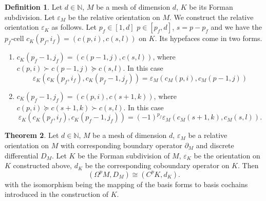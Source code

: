 \documentclass[fleqn]{article}
\theoremstyle{definition}
\newtheorem{theorem}{Theorem}[section]
\newtheorem{definition}[theorem]{Definition}
\begin{document}
\begin{definition}
  Let $d \in \mathbb{N}$, $M$ be a mesh of dimension $d$, $K$ be its Forman
  subdivision.
  Let $\varepsilon_M$ be the relative orientation on $M$.
  We construct the relative orientation $\varepsilon_K$ as follows.
  Let $p_f \in [1, d]$ $p \in [p_f, d]$, $s = p - p_f$ and we have the
  $p_f$-cell $c_K(p_f, i_f) = (c(p, i), c(s, l))$ on $K$.
  Its hypefaces come in two forms.
  \begin{enumerate}
    \item
      $c_K(p_f - 1, j_f) = (c(p - 1, j), c(s, l))$, where
      $c(p, i) \succ c(p - 1, j) \succeq c(s, l)$.
      In this case
      \begin{equation}
        \varepsilon_K(c_K(p_f, i_f), c_K(p_f - 1, j_f))
        = \varepsilon_M(c_M(p, i), c_M(p - 1, j))
      \end{equation}
    \item
      $c_K(p_f - 1, j_f) = (c(p, i), c(s + 1, k))$, where
      $c(p, i) \succeq c(s + 1, k) \succ c(s, l)$.
      In this case
      \begin{equation}
        \varepsilon_K(c_K(p_f, i_f), c_K(p_f - 1, j_f))
        = (-1)^{p_f} \varepsilon_M(c_M(s + 1, k), c_M(s, l)).
      \end{equation}
  \end{enumerate}
\end{definition}

\begin{theorem}
  Let $d \in \mathbb{N}$, $M$ be a mesh of dimension $d$,
  $\varepsilon_M$ be a relative orientation on $M$ with corresponding boundary
  operator $\partial_M$ and discrete differential $D_M$.
  Let $K$ be the Forman subdivision of $M$,
  $\varepsilon_K$ be the orientation on $K$ constructed above,
  $d_K$ be the corresponding coboundary operator on $K$.
  Then
  \begin{equation}
    (\Omega^p M, D_M) \cong (C^p K, d_K).
  \end{equation}
  with the isomorphism being the mapping of the basis forms to basis cochains
  introduced in the construction of $K$.
\end{theorem}
\end{document}

